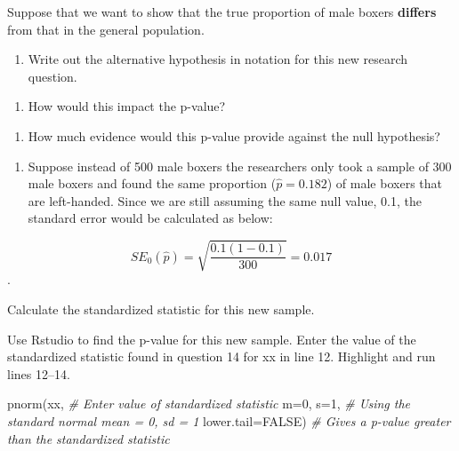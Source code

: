 \documentclass[
]{report}
\newenvironment{Shaded}{\begin{snugshade}}{\end{snugshade}}
\newcommand{\AttributeTok}[1]{\textcolor[rgb]{0.77,0.63,0.00}{#1}}
\newcommand{\CommentTok}[1]{\textcolor[rgb]{0.56,0.35,0.01}{\textit{#1}}}
\newcommand{\ConstantTok}[1]{\textcolor[rgb]{0.00,0.00,0.00}{#1}}
\newcommand{\DecValTok}[1]{\textcolor[rgb]{0.00,0.00,0.81}{#1}}
\newcommand{\FunctionTok}[1]{\textcolor[rgb]{0.00,0.00,0.00}{#1}}
\newcommand{\NormalTok}[1]{#1}
\providecommand{\tightlist}{%
  \setlength{\itemsep}{0pt}\setlength{\parskip}{0pt}}
\begin{document}
Suppose that we want to show that the true proportion of male boxers \textbf{differs} from that in the general population.

\begin{enumerate}
\def\labelenumi{\arabic{enumi}.}
\setcounter{enumi}{12}
\tightlist
\item
  Write out the alternative hypothesis in notation for this new research question.
\end{enumerate}

\vspace{0.5in}

\begin{enumerate}
\def\labelenumi{\arabic{enumi}.}
\setcounter{enumi}{13}
\tightlist
\item
  How would this impact the p-value?
\end{enumerate}

\vspace{0.2in}

\begin{enumerate}
\def\labelenumi{\arabic{enumi}.}
\setcounter{enumi}{14}
\tightlist
\item
  How much evidence would this p-value provide against the null hypothesis?
\end{enumerate}

\vspace{0.3in}

\begin{enumerate}
\def\labelenumi{\arabic{enumi}.}
\setcounter{enumi}{15}
\tightlist
\item
  Suppose instead of 500 male boxers the researchers only took a sample of 300 male boxers and found the same proportion (\(\hat{p}=0.182\)) of male boxers that are left-handed. Since we are still assuming the same null value, 0.1, the standard error would be calculated as below:
\end{enumerate}

\[SE_0(\hat{p})=\sqrt{\frac{0.1(1-0.1)}{300}} = 0.017\].

Calculate the standardized statistic for this new sample.

\vspace{0.8in}

Use Rstudio to find the p-value for this new sample. Enter the value of the standardized statistic found in question 14 for xx in line 12. Highlight and run lines 12--14.

\begin{Shaded}
\begin{Highlighting}[]
\FunctionTok{pnorm}\NormalTok{(xx, }\CommentTok{\# Enter value of standardized statistic}
      \AttributeTok{m=}\DecValTok{0}\NormalTok{, }\AttributeTok{s=}\DecValTok{1}\NormalTok{, }\CommentTok{\# Using the standard normal mean = 0, sd = 1}
      \AttributeTok{lower.tail=}\ConstantTok{FALSE}\NormalTok{) }\CommentTok{\# Gives a p{-}value greater than the standardized statistic}
\end{Highlighting}
\end{Shaded}
\end{document}

